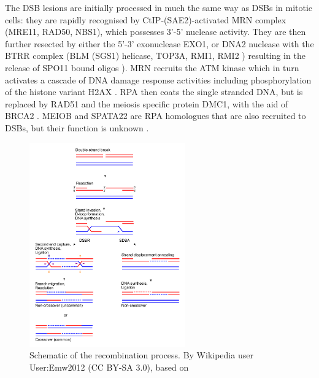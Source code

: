 The DSB lesions are initially processed in much the same way as DSBs in mitotic cells: they are rapidly recognised by CtIP-(SAE2)-activated MRN complex (MRE11, RAD50, NBS1), which possesses 3'-5' nuclease activity.
They are then further resected by either the 5'-3' exonuclease EXO1, or DNA2 nuclease with the BTRR complex (BLM (SGS1) helicase, TOP3A, RMI1, RMI2 \parencite{Daley2014Multifaceted}) resulting in the release of SPO11 bound oligos \parencite[Reviewed in][]{Symington2014End, Schiller2014Structural, Lam2015Mechanism}).
MRN recruits the ATM kinase which in turn activates a cascade of DNA damage response activities including phosphorylation of the histone variant H2AX \parencite{Marechal2013DNA}.
RPA then coats the single stranded DNA, but is replaced by RAD51 and the meiosis specific protein DMC1, with the aid of BRCA2 \parencite{Liu2010Human, Jensen2010Purified, Shi2019Dual}.
MEIOB and SPATA22 are RPA homologues that are also recruited to DSBs, but their function is unknown \parencite{Xu2017Meiosisspecific}.


\begin{figure}[H]
	\centering
	\includegraphics[width=0.6\textwidth]{figures/intro/recombination.pdf}
	\caption[Molecular Recombination]{Schematic of the recombination process. By Wikipedia user User:Emw2012 (CC BY-SA 3.0), based on \cite{Sung2006Mechanism}}
	\label{fig:molecular_recombination}
\end{figure}

